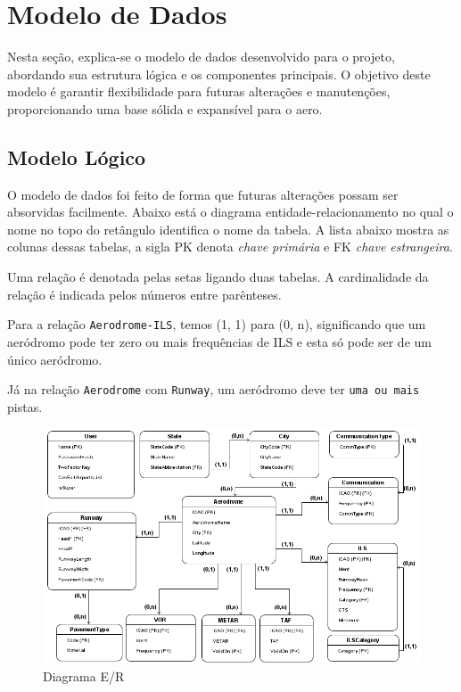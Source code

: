 \chapter{Modelo de Dados}

Nesta seção, explica-se o modelo de dados desenvolvido para o projeto, abordando sua estrutura 
lógica e os componentes principais. O objetivo deste modelo é garantir flexibilidade para futuras alterações e 
manutenções, proporcionando uma base sólida e expansível para o aero.

\section{Modelo Lógico}

O modelo de dados foi feito de forma que futuras alterações
possam ser absorvidas facilmente. Abaixo está o diagrama entidade-relacionamento no qual
o nome no topo do retângulo identifica o nome da tabela. A lista abaixo mostra
as colunas dessas tabelas, a sigla PK denota \textit{chave primária} e FK \textit{chave estrangeira}.

Uma relação é denotada pelas setas ligando duas tabelas. A cardinalidade da relação é indicada
pelos números entre parênteses. 

Para a relação \texttt{Aerodrome-ILS}, temos (1, 1) para (0, n), significando que um aeródromo pode
ter zero ou mais frequências de ILS e esta só pode ser de um único aeródromo.

Já na relação \texttt{Aerodrome} com \texttt{Runway}, um aeródromo deve ter \texttt{uma ou mais} pistas.


\begin{figure}[ht]
    \begin{center}
    \includegraphics[width=400pt]{img/ERAero.png}
    \caption{Diagrama E/R}
    \label{fig:diagrama-er}
    \end{center}
\end{figure}

